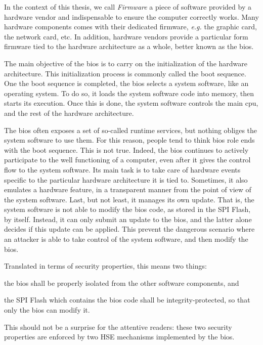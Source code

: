 In the context of this thesis, we call \emph{Firmware} a piece of software
provided by a hardware vendor and indispensable to ensure the computer correctly
works.
%
Many hardware components comes with their dedicated firmware, \emph{e.g.} the
graphic card, the network card, etc.
%
In addition, hardware vendors provide a particular form firmware tied to the
hardware architecture as a whole, better known as the \ac{bios}.

The main objective of the \ac{bios} is to carry on the initialization of the
hardware architecture.
%
This initialization process is commonly called the boot sequence.
%
One the boot sequence is completed, the \ac{bios} selects a system software,
like an operating system.
%
To do so, it loads the system software code into memory, then starts its
execution.
%
Once this is done, the system software controls the main \ac{cpu}, and the rest
of the hardware architecture.

The \ac{bios} often exposes a set of so-called runtime services, but nothing
obliges the system software to use them.
%
For this reason, people tend to think \ac{bios} role ends with the boot
sequence.
%
This is not true.
%
Indeed, the \ac{bios} continues to actively participate to the well functioning
of a computer, even after it gives the control flow to the system software.
%
Its main task is to take care of hardware events specific to the particular
hardware architecture it is tied to.
%
Sometimes, it also emulates a hardware feature, in a transparent manner from the
point of view of the system software.  
%
Last, but not least, it manages its own update.
%
That is, the system software is not able to modify the \ac{bios} code, as stored
in the SPI Flash, by itself.
%
Instead, it can only submit an update to the \ac{bios}, and the latter alone
decides if this update can be applied.
%
This prevent the dangerous scenario where an attacker is able to take control of
the system software, and then modify the \ac{bios}.

Translated in terms of security properties, this means two things:
%
\begin{inparaenum}[(1)]
\item the \ac{bios} shall be properly isolated from the other software
  components, and
\item the SPI Flash which contains the \ac{bios} code shall be
  integrity-protected, so that only the \ac{bios} can modify it.
\end{inparaenum}
%
This should not be a surprise for the attentive readers: these two security
properties are enforced by two HSE mechanisms implemented by the \ac{bios}.

